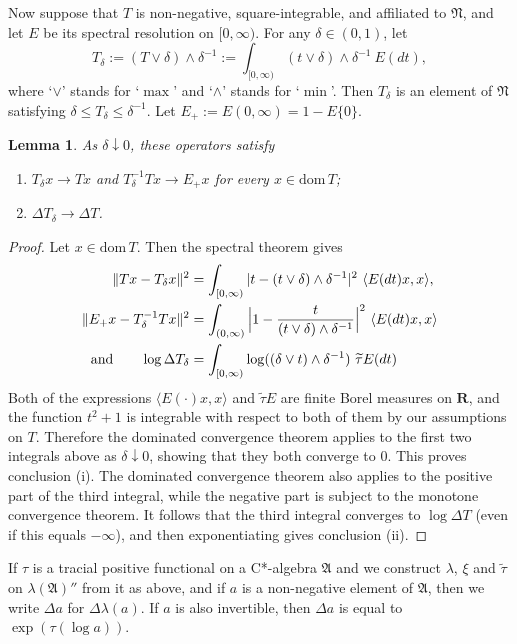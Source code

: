 \documentclass[12pt,a4paper]{article}
\numberwithin{equation}{section}
\newtheorem{lem}[thm]{Lemma}
\theoremstyle{remark}
\newcommand{\bbR}{\mathbf{R}}
\newcommand{\A}{\mathfrak{A}}
\newcommand{\N}{\mathfrak{N}}
\renewcommand{\l}{\lambda}
\renewcommand{\t}[1]{\widetilde{#1}}
\newcommand{\dom}{\mathrm{dom}\,}
\begin{document}
Now suppose that $T$ is non-negative, square-integrable, and affiliated to $\N$, and let $E$ be its spectral resolution on $[0,\infty)$.  For any $\delta \in (0,1)$, let 
	\[T_\delta := (T\vee \delta)\wedge \delta^{-1} :=  \int_{[0,\infty)} (t\vee \delta)\wedge \delta^{-1}\ E(dt),\]
	where `$\vee$' stands for `$\max$' and `$\wedge$' stands for `$\min$'. Then $T_\delta$ is an element of $\N$ satisfying $\delta \le T_\delta \le \delta^{-1}$.  Let $E_+ := E(0,\infty) = 1 - E\{0\}$.

\begin{lem}\label{lem:Kap+}
 As $\delta \downarrow 0$, these operators satisfy
	\begin{enumerate}
	\item[i.] $T_\delta x \to Tx$ and $T_\delta^{-1}T x \to E_+x$ for every $x \in \dom T$;
	\item[ii.] $\Delta T_\delta \to \Delta T$.
	\end{enumerate}
\end{lem}

\begin{proof}
Let $x \in \dom T$. Then the spectral theorem gives
\begin{align*}
	\|Tx - T_\delta x\|^2 &= \int_{[0,\infty)} |t - (t\vee \delta)\wedge \delta^{-1}|^2\ \langle E(dt)x,x\rangle,\\
	\|E_+x - T_\delta^{-1}Tx\|^2 &= \int_{(0,\infty)} \Big|1 - \frac{t}{(t\vee \delta)\wedge \delta^{-1}}\Big|^2\ \langle E(dt)x,x\rangle\\
	\hbox{and} \qquad \log \Delta T_\delta &= \int_{[0,\infty)} \log((\delta \vee t)\wedge \delta^{-1})\ \t{\tau} E(dt)
\end{align*}
	Both of the expressions $\langle E(\cdot)x,x\rangle$ and $\t{\tau}E$ are finite Borel measures on $\bbR$, and the function $t^2+1$ is integrable with respect to both of them by our assumptions on $T$.  Therefore the dominated convergence theorem applies to the first two integrals above as $\delta \downarrow 0$, showing that they both converge to $0$.  This proves conclusion (i).  The dominated convergence theorem also applies to the positive part of the third integral, while the negative part is subject to the monotone convergence theorem.  It follows that the third integral converges to $\log \Delta T$ (even if this equals $-\infty$), and then exponentiating gives conclusion (ii).
\end{proof}

If $\tau$ is a tracial positive functional on a C*-algebra $\A$ and we construct $\l$, $\xi$ and $\t{\tau}$ on $\l(\A)''$ from it as above, and if $a$ is a non-negative element of $\A$, then we write $\Delta a$ for $\Delta \l(a)$.  If $a$ is also invertible, then $\Delta a$ is equal to $\exp(\tau(\log a))$.
\end{document}
